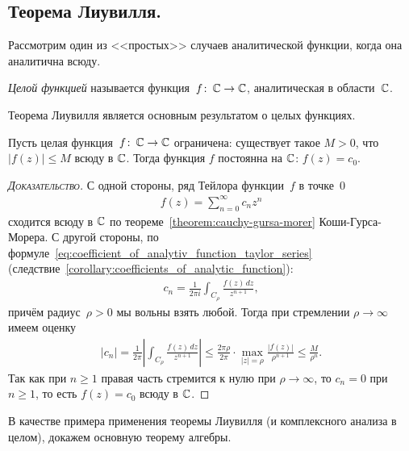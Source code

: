 \documentclass[../complex-analysis.tex]{subfiles}
\begin{document}
\subsection{Теорема Лиувилля.}

Рассмотрим один из <<простых>> случаев аналитической функции, когда она аналитична всюду.

\begin{df}
 \emph{Целой функцией} называется функция~$ f\colon\,\mathbb{C}\to\mathbb{C} $, аналитическая в области~$ \mathbb{C} $.
\end{df}

Теорема Лиувилля является основным результатом о целых функциях.

\begin{thm}[Лиувилля]
 \label{theorem:liuvill}
 Пусть целая функция~$ f\colon\,\mathbb{C}\to\mathbb{C} $ ограничена: существует такое $ M > 0 $, что $ \left| f(z) \right| \leqslant M $ всюду в $ \mathbb{C} $. Тогда функция $ f $ постоянна на $ \mathbb{C} $: $ f(z) = c_0 $.
\end{thm}
\begin{proof}[\normalfont\textsc{Доказательство}]
 С одной стороны, ряд Тейлора функции~$ f $ в точке~$ 0 $
 \begin{align*}
  f(z) = \sum_{n=0}^{\infty} c_n z^{n}
 \end{align*} сходится всюду в $ \mathbb{C} $ по теореме~\ref{theorem:cauchy-gursa-morer} Коши-Гурса-Морера. С другой стороны, по формуле~\eqref{eq:coefficient_of_analytiv_function_taylor_series} (следствие~\ref{corollary:coefficients_of_analytic_function}):
 \begin{align*}
  c_n = \frac{1}{2\pi i} \int_{C_\rho} \frac{f(z)\,dz}{z^{n+1}},
 \end{align*} причём радиус~$ \rho > 0 $ мы вольны взять любой. Тогда при стремлении $ \rho \to \infty $ имеем оценку
 \begin{align*}
  \left| c_n \right| = \frac{1}{2\pi} \left| \int_{C_\rho} \frac{f(z)\,dz}{z^{n+1}}  \right|\leqslant \frac{2\pi\rho}{2\pi} \cdot \max_{\left| z \right|=\rho} \frac{\left| f(z) \right|}{\rho^{n+1}} \leqslant \frac{M}{\rho^{n}}.
 \end{align*} Так как при $ n \geqslant 1 $ правая часть стремится к нулю при $ \rho \to \infty $, то $ c_n = 0 $ при $ n \geqslant 1 $, то есть $ f(z) = c_0 $ всюду в $ \mathbb{C} $.
\end{proof}

В качестве примера применения теоремы Лиувилля (и комплексного анализа в целом), докажем основную теорему алгебры.
\end{document}

